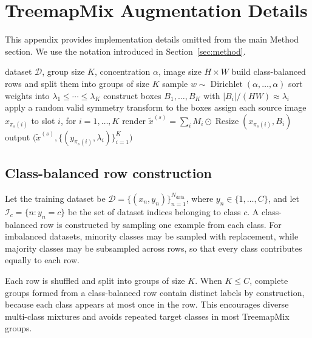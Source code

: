 \section{TreemapMix Augmentation Details}\label{app:labelmix-details}

This appendix provides implementation details omitted from the main Method section. We use the notation introduced in Section~\ref{sec:method}.

\begin{algorithm}[t]
\caption{TreemapMix augmentation}
\label{alg:labelmix}
\small
\begin{algorithmic}[1]
\Require dataset \(\mathcal{D}\), group size \(K\), concentration \(\alpha\), image size \(H\times W\)
\State build class-balanced rows and split them into groups of size \(K\)
    \State sample \(w\sim\operatorname{Dirichlet}(\alpha,\ldots,\alpha)\)
    \State sort weights into \(\lambda_1\le\cdots\le\lambda_K\)
    \State construct boxes \(B_1,\dots,B_K\) with \(|B_i|/(HW)\approx\lambda_i\)
    \State apply a random valid symmetry transform to the boxes
        \State assign each source image \(x_{\pi_s(i)}\) to slot \(i\), for \(i=1,\dots,K\)
        \State render \(\tilde{x}^{(s)}=\sum_i M_i\odot\operatorname{Resize}(x_{\pi_s(i)},B_i)\)
        \State output \(\bigl(\tilde{x}^{(s)},\{(y_{\pi_s(i)},\lambda_i)\}_{i=1}^{K}\bigr)\)
    \EndFor
\EndFor
\end{algorithmic}
\end{algorithm}

\subsection{Class-balanced row construction}

Let the training dataset be \(\mathcal{D}=\{(x_n,y_n)\}_{n=1}^{N_{\mathrm{data}}}\), where \(y_n\in\{1,\dots,C\}\), and let \(\mathcal{I}_c=\{n:y_n=c\}\) be the set of dataset indices belonging to class $c$. A class-balanced row is constructed by sampling one example from each class. For imbalanced datasets, minority classes may be sampled with replacement, while majority classes may be subsampled across rows, so that every class contributes equally to each row.

Each row is shuffled and split into groups of size $K$. When $K\le C$, complete groups formed from a class-balanced row contain distinct labels by construction, because each class appears at most once in the row. This encourages diverse multi-class mixtures and avoids repeated target classes in most TreemapMix groups.


